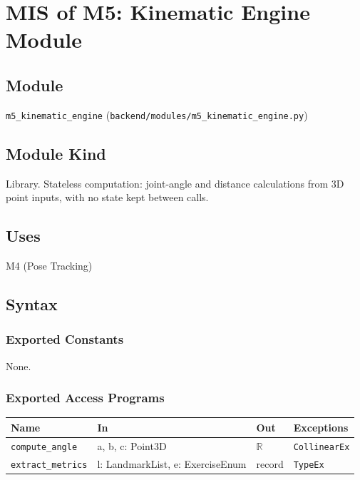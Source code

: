 \documentclass[12pt, titlepage]{article}
\begin{document}
\newpage

\section{MIS of M5: Kinematic Engine Module} \label{M5}

\subsection{Module}
\texttt{m5\_kinematic\_engine} (\texttt{backend/modules/m5\_kinematic\_engine.py})

\subsection{Module Kind}
Library. Stateless computation: joint-angle and distance calculations
from 3D point inputs, with no state kept between calls.

\subsection{Uses}
M4 (Pose Tracking)

\subsection{Syntax}

\subsubsection{Exported Constants}
None.

\subsubsection{Exported Access Programs}

\begin{center}
\begin{tabular}{p{4cm} p{5.5cm} p{2cm} p{3cm}}
\hline
\textbf{Name} & \textbf{In} & \textbf{Out} & \textbf{Exceptions} \\
\hline
\texttt{compute\_angle} & a, b, c: Point3D & $\mathbb{R}$ & \texttt{CollinearEx}\\
\texttt{extract\_metrics} & l: LandmarkList, e: ExerciseEnum & record & \texttt{TypeEx}\\
\hline
\end{tabular}
\end{center}
\end{document}
